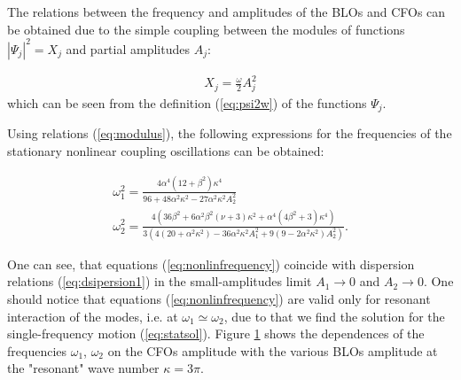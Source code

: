 The relations between the frequency and amplitudes of the BLOs and CFOs can be obtained due to the simple coupling between the modules of functions $|\Psi_{j}|^2=X_{j}$ and partial amplitudes $A_{j}$:

\begin{eqnarray}\label{eq:modulus}
X_{j}=\frac{\omega}{2} A_{j}^{2}
\end{eqnarray}
which can be seen from the definition (\ref{eq:psi2w}) of the functions $\Psi_{j}$.

Using relations (\ref{eq:modulus}), the following expressions for the frequencies of the stationary nonlinear coupling oscillations can be obtained:

\begin{eqnarray}\label{eq:nonlinfrequency}
\omega_{1}^2   = \frac{4 \alpha ^4 \left(12+\beta ^2\right) \kappa ^4}{96+48 \alpha ^2 \kappa ^2-27 \alpha ^2 \kappa ^2 A_2^2 } \nonumber  \\
\omega_{2}^2   = \frac{4 \left(36 \beta ^2+6 \alpha ^2 \beta ^2  (\nu +3) \kappa ^2+\alpha ^4 \left(4 \beta ^2+3\right) \kappa ^4 \right)}{3 \left( 4 (20+ \alpha ^2 \kappa^2) -36 \alpha ^2  \kappa ^2 A_1^2+9  \left(9-2 \alpha ^2 \kappa ^2\right) A_2^2 \right)}.
\end{eqnarray}

One can see, that equations (\ref{eq:nonlinfrequency}) coincide with dispersion relations (\ref{eq:dsipersion1}) in the small-amplitudes limit $A_{1} \to 0$ and $A_{2} \to 0$.
One should notice that equations (\ref{eq:nonlinfrequency}) are valid only for resonant interaction of the modes, i.e. at $\omega_{1} \simeq \omega_{2}$, due to that we find the solution for the single-frequency motion (\ref{eq:statsol}).
Figure \ref{fig:resonant1} shows the dependences of the frequencies $\omega_{1}$, $\omega_{2}$ on the CFOs amplitude with the various BLOs amplitude at the "resonant" wave number $\kappa=3 \pi$.

\begin{figure}
\label{fig:resonant1}
\end{figure}

%

